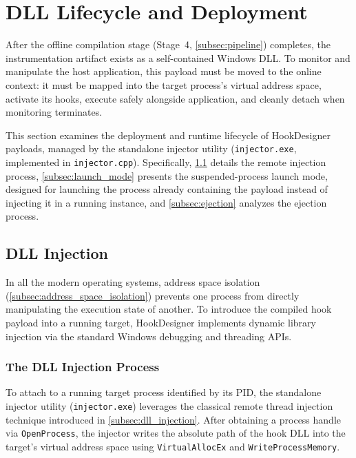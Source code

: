 \section{DLL Lifecycle and Deployment}
\label{sec:injection_lifecycle}

After the offline compilation stage (Stage~4, \cref{subsec:pipeline}) completes, the instrumentation artifact exists as a self-contained Windows \ac{DLL}.
To monitor and manipulate the host application, this payload must be moved to the online context: it must be mapped into the target process's virtual address space, activate its hooks, execute safely alongside application, and cleanly detach when monitoring terminates.

This section examines the deployment and runtime lifecycle of HookDesigner payloads, managed by the standalone injector utility (\texttt{injector.exe}, implemented in \texttt{injector.}\allowbreak\texttt{cpp}).
Specifically, \cref{subsec:injection} details the remote injection process, \cref{subsec:launch_mode} presents the suspended-process launch mode, designed for launching the process already containing the payload instead of injecting it in a running instance, and \cref{subsec:ejection} analyzes the ejection process.

\subsection{DLL Injection}
\label{subsec:injection}

In all the modern operating systems, address space isolation (\cref{subsec:address_space_isolation}) prevents one process from directly manipulating the execution state of another.
To introduce the compiled hook payload into a running target, HookDesigner implements dynamic library injection via the standard Windows debugging and threading \acp{API}.

\subsubsection{The DLL Injection Process}

To attach to a running target process identified by its \ac{PID}, the standalone injector utility (\texttt{injector.exe}) leverages the classical remote thread injection technique introduced in \cref{subsec:dll_injection}.
After obtaining a process handle via \texttt{OpenProcess}, the injector writes the absolute path of the hook \ac{DLL} into the target's virtual address space using \texttt{VirtualAllocEx} and \texttt{WriteProcessMemory}.

